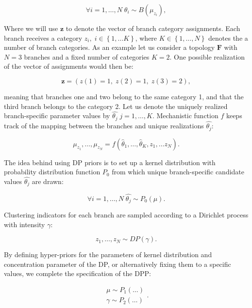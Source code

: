 \begin{equation}
\forall i=1,\ldots,N \; \theta_{i}\sim B(\mu_{z_{i}}),
\label{eq:dpp1}
\end{equation}

\noindent
Where we will use $\mathbf{z}$ to denote the vector of branch category assignments.
Each branch receives a category $z_{i},\; i\in\left\{ 1,\ldots K\right\}$, where $K\in\left\{ 1,\ldots,N\right\}$ denotes the a number of branch categories.
As an example let us consider a topology $\mathbf{F}$ with $N=3$ branches and a fixed number of categories $K=2$.
One possible realization of the vector of assignments would then be:

$$\mathbf{z}=\left(z(1)=1,\; z(2)=1,\; z(3)=2\right),$$ 

\noindent
meaning that branches one and two belong to the same category 1, and that the third branch belongs to the category 2.
Let us denote the uniquely realized branch-specific parameter values by $\hat{\theta_{j}}\; j=1,\ldots,K$.
Mechanistic function $f$ keeps track of the mapping between the branches and unique realizations $\hat{\theta_{j}}$:

\begin{equation}
\mu_{z_{1}},\ldots,\mu_{z_{N}}=f\left(\hat{\theta}_{1},\ldots,\hat{\theta}_{K},z_{1},\ldots z_{N}\right).
\label{eq:dpp2}
\end{equation}

\noindent
The idea behind using DP priors is to set up a kernel distribution with probability distribution function $P_{0}$ from which unique branch-specific candidate values $\hat{\theta_{j}}$ are drawn:

\begin{equation}
\forall i=1,\ldots,N\;\hat{\theta_{j}}\sim P_{0}\left(\mu\right).
\label{eq:dpp3}
\end{equation}

\noindent
Clustering indicators for each branch are sampled according to a Dirichlet process with intensity $\gamma$:

\begin{equation}
z_{1},\ldots,z_{N}\sim DP(\gamma).
\label{eq:dpp4}
\end{equation}

\noindent
By defining hyper-priors for the parameters of kernel distribution and concentration parameter of the DP, or alternatively fixing them to a specific values, we complete the specification of the DPP:

\begin{equation}
\begin{array}{c}
\mu\sim P_{1}(\ldots)\\
\gamma\sim P_{2}(\ldots)
\end{array}.
\label{eq:dpp5}
\end{equation}

